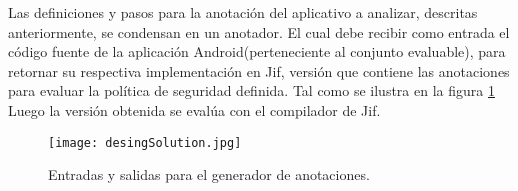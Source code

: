 Las definiciones y pasos para la anotación del aplicativo a analizar, descritas
anteriormente, se condensan en un anotador. El cual debe recibir como entrada el
código fuente de la aplicación Android(perteneciente al conjunto evaluable),
para retornar su respectiva implementación en Jif, versión que contiene las
anotaciones para evaluar la política de seguridad definida. Tal como se ilustra
en la figura \ref{fig:desingSolution}\newline 
Luego la versión obtenida se evalúa con el compilador de Jif.
\label{subsec:anotador}
\label{subsec:pasosSol}
\begin{figure}[H]
	\begin{center}
	\texttt{[image: desingSolution.jpg]}
	\end{center}
	\caption{Entradas y salidas para el generador de anotaciones.}
	\label{fig:desingSolution} 
\end{figure}

